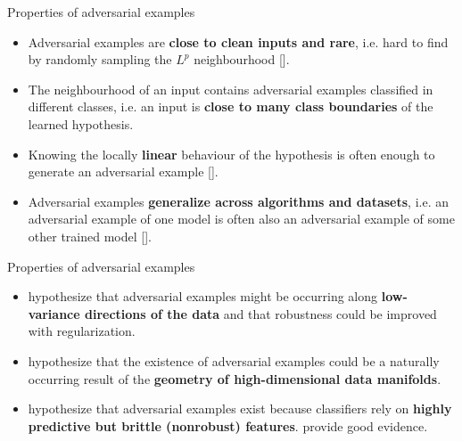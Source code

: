 \documentclass{beamer}
\newcommand{\citet}[1]{{\color{citecolor}\relscale{0.8}\textcite{#1}}}
\newcommand{\citep}[1]{{\color{citecolor}\relscale{0.8}[\textcite{#1}]}}
\begin{document}
\begin{frame}[allowframebreaks=0.9]{Properties of adversarial examples}
\begin{itemize}
	\item Adversarial examples are \textbf{close to clean inputs and rare}, i.e. hard to find by randomly sampling the $L^p$ neighbourhood \citep{Szegedy:2013:IPNN}.    
	\item The neighbourhood of an input contains adversarial examples classified in different classes, i.e. an input is \textbf{close to many class boundaries} of the learned hypothesis.
    \item Knowing the locally \textbf{linear} behaviour of the hypothesis is often enough to generate an adversarial example \citep{Goodfellow:2014:EHAE}.
    \item Adversarial examples \textbf{generalize across algorithms and datasets}, i.e. an adversarial example of one model is often also an adversarial example of some other trained model \citep{Szegedy:2013:IPNN,Papernot:2016:TMLPBBAAS,Liu:2016:DTAEBBA,Tramer:2017:STAE}.
\end{itemize}
\end{frame}

\begin{frame}[allowframebreaks=0.9]{Properties of adversarial examples}
\begin{itemize}
    \item \citet{Tanay:2016:ABTPPAE} hypothesize that adversarial examples might be occurring along \textbf{low-variance directions of the data} and that robustness could be improved with regularization.
    \item \citet{Gilmer:2018:AS} hypothesize that the existence of adversarial examples could be a naturally occurring result of the \textbf{geometry of high-dimensional data manifolds}.
    \item \citet{Tsipras:2018:RMBOA,Ilyas:2019:AENBTF} hypothesize that adversarial examples exist because classifiers rely on \textbf{highly predictive but brittle (nonrobust) features}. \citet{Ilyas:2019:AENBTF} provide good evidence.
\end{itemize}
\end{frame}
\end{document}
